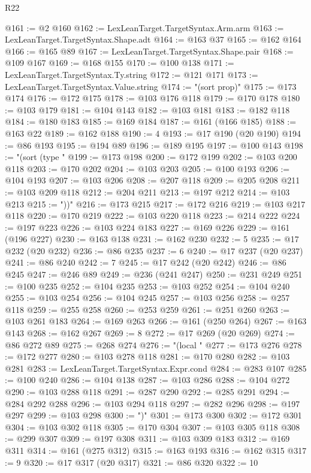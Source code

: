 \begin{lexlean}{R22}
\begin{coremodule}
@161 := @2 @160
@162 := LexLeanTarget.TargetSyntax.Arm.arm
@163 := LexLeanTarget.TargetSyntax.Shape.adt
@164 := @163 @37
@165 := @162 @164
@166 := @165 @89
@167 := LexLeanTarget.TargetSyntax.Shape.pair
@168 := @109 @167
@169 := @168 @155
@170 := @100 @138
@171 := LexLeanTarget.TargetSyntax.Ty.string
@172 := @121 @171
@173 := LexLeanTarget.TargetSyntax.Value.string
@174 := "(sort prop)"
@175 := @173 @174
@176 := @172 @175
@178 := @103 @176 @118
@179 := @170 @178
@180 := @103 @179
@181 := @104 @143
@182 := @103 @181
@183 := @182 @118
@184 := @180 @183
@185 := @169 @184
@187 := @161 (@166 @185)
@188 := @163 @22
@189 := @162 @188
@190 := 4
@193 := @17 @190 (@20 @190)
@194 := @86 @193
@195 := @194 @89
@196 := @189 @195
@197 := @100 @143
@198 := "(sort (type "
@199 := @173 @198
@200 := @172 @199
@202 := @103 @200 @118
@203 := @170 @202
@204 := @103 @203
@205 := @100 @193
@206 := @104 @193
@207 := @103 @206
@208 := @207 @118
@209 := @205 @208
@211 := @103 @209 @118
@212 := @204 @211
@213 := @197 @212
@214 := @103 @213
@215 := "))"
@216 := @173 @215
@217 := @172 @216
@219 := @103 @217 @118
@220 := @170 @219
@222 := @103 @220 @118
@223 := @214 @222
@224 := @197 @223
@226 := @103 @224 @183
@227 := @169 @226
@229 := @161 (@196 @227)
@230 := @163 @138
@231 := @162 @230
@232 := 5
@235 := @17 @232 (@20 @232)
@236 := @86 @235
@237 := 6
@240 := @17 @237 (@20 @237)
@241 := @86 @240
@242 := 7
@245 := @17 @242 (@20 @242)
@246 := @86 @245
@247 := @246 @89
@249 := @236 (@241 @247)
@250 := @231 @249
@251 := @100 @235
@252 := @104 @235
@253 := @103 @252
@254 := @104 @240
@255 := @103 @254
@256 := @104 @245
@257 := @103 @256
@258 := @257 @118
@259 := @255 @258
@260 := @253 @259
@261 := @251 @260
@263 := @103 @261 @183
@264 := @169 @263
@266 := @161 (@250 @264)
@267 := @163 @143
@268 := @162 @267
@269 := 8
@272 := @17 @269 (@20 @269)
@274 := @86 @272 @89
@275 := @268 @274
@276 := "(local "
@277 := @173 @276
@278 := @172 @277
@280 := @103 @278 @118
@281 := @170 @280
@282 := @103 @281
@283 := LexLeanTarget.TargetSyntax.Expr.cond
@284 := @283 @107
@285 := @100 @240
@286 := @104 @138
@287 := @103 @286
@288 := @104 @272
@290 := @103 @288 @118
@291 := @287 @290
@292 := @285 @291
@294 := @284 @292 @288
@296 := @103 @294 @118
@297 := @282 @296
@298 := @197 @297
@299 := @103 @298
@300 := ")"
@301 := @173 @300
@302 := @172 @301
@304 := @103 @302 @118
@305 := @170 @304
@307 := @103 @305 @118
@308 := @299 @307
@309 := @197 @308
@311 := @103 @309 @183
@312 := @169 @311
@314 := @161 (@275 @312)
@315 := @163 @193
@316 := @162 @315
@317 := 9
@320 := @17 @317 (@20 @317)
@321 := @86 @320
@322 := 10

\end{coremodule}
\end{lexlean}
